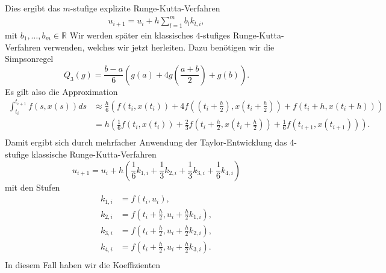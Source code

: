 Dies ergibt das $m$-stufige explizite Runge-Kutta-Verfahren
\begin{align}
    u_{i+1} = u_i + h \sum_{l=1}^{m} b_l k_{l,i},   \label{exp-rk-def}
\end{align}
mit $b_1, \dots, b_m \in \mathbb{R}$
Wir werden später ein klassisches $4$-stufiges Runge-Kutta-Verfahren verwenden, welches wir jetzt herleiten.
Dazu benötigen wir die Simpsonregel
\[
    Q_3(g) = \frac{b-a}{6} (g(a) + 4g(\frac{a+b}{2}) +g(b)).
\]
Es gilt also die Approximation
\begin{align*}
    \int_{t_i}^{t_{i+1}} f(s,x(s)) ds &\approx
    \frac{h}{6}(f(t_i,x(t_i)) + 4f((t_i + \frac{h}{2}), x(t_i+\frac{h}{2})) + f(t_i + h,x(t_i + h))) \\
    &= h\left(\frac{1}{6}f(t_i,x(t_i)) + \frac{2}{3}f\left( t_i + \frac{h}{2}, x\left( t_i + \frac{h}{2}\right) \right)
    + \frac{1}{6}f(t_{i+1},x(t_{i+1}))\right). \\
\end{align*}
Damit ergibt sich durch mehrfacher Anwendung der Taylor-Entwicklung das 4-stufige klassische Runge-Kutta-Verfahren
\[
    u_{i+1} = u_i + h\left( \frac{1}{6}k_{1,i} + \frac{1}{3} k_{2,i} + \frac{1}{3} k_{3,i} + \frac{1}{6} k_{4,i} \right)
\]
mit den Stufen
\begin{align*}
    k_{1,i} &= f(t_i,u_i), \\
    k_{2,i} &= f(t_i + \frac{h}{2}, u_i + \frac{h}{2}k_{1,i}), \\
    k_{3,i} &= f(t_i + \frac{h}{2}, u_i + \frac{h}{2}k_{2,i}), \\
    k_{4,i} &= f(t_i + \frac{h}{2}, u_i + \frac{h}{2}k_{3,i}). \\
\end{align*}
In diesem Fall haben wir die Koeffizienten
